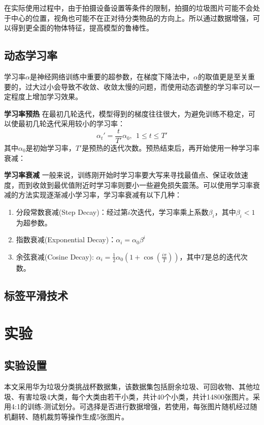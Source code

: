 \documentclass[a4paper]{article}
\begin{document}
\begin{CJK*}{UTF8}{gbsn}
在实际使用过程中，由于拍摄设备设置等条件的限制，拍摄的垃圾图片可能不会处于中心的位置，视角也可能不在正对待分类物品的方向上。所以通过数据增强，可以得到更全面的物体特征，提高模型的鲁棒性。

\subsection{动态学习率}

学习率$\alpha$是神经网络训练中重要的超参数，在梯度下降法中，$\alpha$的取值更是至关重要的，过大过小会导致不收敛、收敛太慢的问题，而使用动态调整的学习率可以一定程度上增加学习效果。

\textbf{学习率预热}  在最初几轮迭代，模型得到的梯度往往很大，为避免训练不稳定，可以使最初几轮迭代采用较小的学习率：$$\alpha_t'=\frac{t}{T'}\alpha_0,\ \ 1\leq t\leq T'$$
其中$\alpha_0$是初始学习率，$T'$是预热的迭代次数。预热结束后，再开始使用一种学习率衰减：

\textbf{学习率衰减}  一般来说，训练刚开始时学习率要大写来寻找最值点、保证收敛速度，而到收敛到最优值附近时学习率则要小一些避免损失震荡。可以使用学习率衰减的方法实现逐渐减小学习率，学习率衰减有以下几种：

\begin{enumerate}
    \item 分段常数衰减(Step Decay)：经过第$i$次迭代，学习率乘上系数$\beta_i$，其中$\beta_i<1$为超参数。
    \item 指数衰减(Exponential Decay)：$\alpha_i=\alpha_0\beta^i$
    \item 余弦衰减(Cosine Decay): $\alpha_i=\frac{1}{2}\alpha_0(1+\cos(\frac{i\pi}{T}))$，其中$T$是总的迭代次数。
\end{enumerate}


\subsection{标签平滑技术}

\section{实验}
\subsection{实验设置}

本文采用华为垃圾分类挑战杯数据集，该数据集包括厨余垃圾、可回收物、其他垃圾、有害垃圾4大类，每个大类由若干小类，共计40个小类，共计14800张图片。采用4:1的训练-测试划分。可选择是否进行数据增强，若使用，每张图片随机经过随机翻转、随机裁剪等操作生成5张图片。


\end{CJK*}
\end{document}
